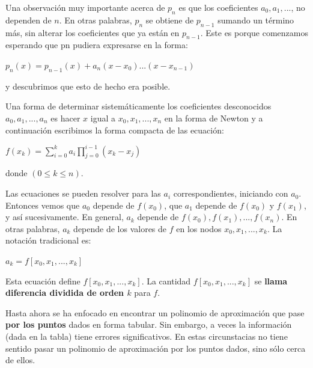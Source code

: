 \documentclass[10pt,a4paper]{article}
\begin{document}
\begin{multicols}{2}
		\noindent Una observación muy importante acerca de $p_n$ es que los coeficientes $a_0, a_1,. ..$, no dependen de $n$. En otras palabras, $p_n$ se obtiene de $p_{n-1}$ sumando un término más, sin alterar los coeficientes que ya están en $p_{n-1}$. Este es porque comenzamos esperando que pn pudiera expresarse en la forma:
		\begin{center}
			$p_n(x) = p_{n-1}(x) + a_n(x-x_0)...(x-x_{n-1})$
		\end{center}
		
		
		y descubrimos que esto de hecho era posible.
		
		\noindent Una forma de determinar sistemáticamente los coeficientes desconocidos $a_0, a_1, . . . , a_n$ es hacer $x$ igual a $x_0, x_1, . . . , x_n$ en la forma de Newton y a continuación escribimos la forma compacta de las ecuación:
		\begin{center}
			$f(x_k) = \displaystyle\sum_{i=0}^k a_i \displaystyle\prod_{j=0}^{i-1} (x_k - x_j)$
			
		\end{center}
		donde $(0 \le k \le n)$.
		
		\noindent Las ecuaciones se pueden resolver para las $a_i$ correspondientes, iniciando con $a_0$. Entonces vemos que $a_0$ depende de $f(x_0)$, que $a_1$ depende de $f(x_0)$ y $f(x_1)$, y así sucesivamente. En general, $a_k$ depende de $f(x_0), f(x_1), . . . , f(x_n)$. En otras palabras, $a_k$ depende de los valores de $f$ en los nodos $x_0, x_1, . . . , x_k$. La notación tradicional es:
		\begin{center}
			$a_k = f [x_0, x_1, . . . , x_k]$
		\end{center}
		
		
		\noindent Esta ecuación define $f[x_0, x_1, . . . , x_k]$. La cantidad $f [x_0, x_1, . . . , x_k]$ se \textbf{llama diferencia dividida de
			orden $k$} para $f$.
		
		\vspace*{0.2cm}
		
		
		\vspace*{0.2cm}
		
		Hasta ahora se ha enfocado en encontrar un polinomio de aproximación que pase \textbf{por los puntos} dados en forma tabular. Sin embargo, a veces la información (dada en la tabla) tiene errores significativos. En estas circunstacias no tiene sentido pasar un polinomio de aproximación por los puntos dados, sino sólo cerca de ellos.
		

\end{multicols}
\end{document}
